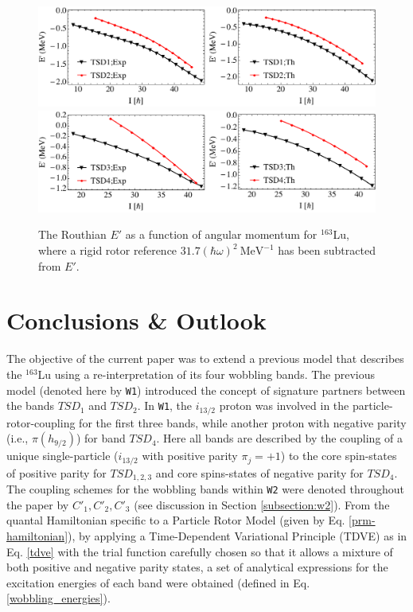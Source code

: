\documentclass[myclassdoc,debug]{rjparticle}
\begin{document}
\begin{figure}
  \centering
  \includegraphics[scale=0.65]{figs/routhians12.pdf}
 \includegraphics[scale=0.65]{figs/routhians34.pdf}
\caption{The Routhian $E'$ as a function of angular momentum for $^{163}$Lu, where a rigid rotor reference $31.7(\hbar\omega)^2\ \text{MeV}^{-1}$ has been subtracted from $E'$.}
    \label{routhians_plot}
\end{figure}

\section{Conclusions \& Outlook}
\label{section-gata}
The objective of the current paper was to extend a previous model that describes the $^{163}$Lu using a re-interpretation of its four wobbling bands. The previous model (denoted here by \texttt{W1}) introduced the concept of signature partners between the bands $TSD_1$ and $TSD_2$. In \texttt{W1}, the $i_{13/2}$ proton was involved in the particle-rotor-coupling for the first three bands, while another proton with negative parity (i.e., $\pi(h_{9/2})$) for band $TSD_4$. Here all bands are described by the coupling of a unique single-particle ($i_{13/2}$ with positive parity $\pi_{j}=+1$) to the core spin-states of positive parity for $TSD_{1,2,3}$ and core spins-states of negative parity for $TSD_4$. The coupling schemes for the wobbling bands within \texttt{W2} were denoted throughout the paper by $C'_1, C'_2, C'_3$ (see discussion in Section \ref{subsection:w2}). From the quantal Hamiltonian specific to a Particle Rotor Model (given by Eq. \ref{prm-hamiltonian}), by applying a Time-Dependent Variational Principle (TDVE) as in Eq. \ref{tdve} with the trial function carefully chosen so that it allows a mixture of both positive and negative parity states, a set of analytical expressions for the excitation energies of each band were obtained (defined in Eq. \ref{wobbling_energies}).
\end{document}
